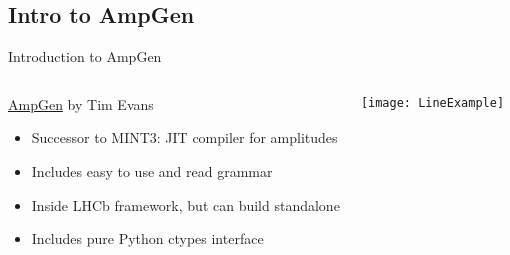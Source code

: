 \documentclass[aspectratio=169, smaller]{beamer}
\begin{document}
\subsection{Intro to AmpGen}
\begin{frame}{Introduction to AmpGen}
    \begin{columns}
        \begin{block}{\href{https://gitlab.cern.ch/lhcb/Gauss/tree/LHCBGAUSS-1058.AmpGenDev/Gen/AmpGen}{AmpGen} by Tim Evans}
            \begin{itemize}
                \item Successor to MINT3: JIT compiler for amplitudes
                \item Includes easy to use and read grammar
                \item Inside LHCb framework, but can build standalone 
                \item Includes pure Python ctypes interface
            \end{itemize}
        \end{block}
        \texttt{[image: LineExample]}
    \end{columns}
    
\end{frame}
\end{document}
